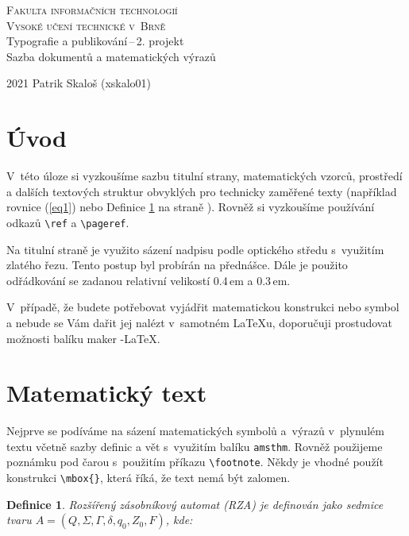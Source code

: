 \documentclass[a4paper, 11pt, twocolumn]{article}
\newtheorem{definice}{Definice}
\begin{document}
    \begin{titlepage}
        \begin{center}
            \Huge
            \textsc{Fakulta informačních technologií} \\
            \textsc{Vysoké učení technické v~Brně} \\
            \LARGE
            Typografie a publikování\,--\,2. projekt \\
            Sazba dokumentů a matematických výrazů \\
        \end{center}
        {\Large 2021\hfill
        Patrik Skaloš (xskalo01)}
    \end{titlepage}

    \section*{Úvod}
    \label{page2}
    V~této úloze si vyzkoušíme sazbu titulní strany, matematic\-kých
    vzorců, prostředí a dalších textových struktur obvyklých
    pro technicky zaměřené texty (například rovnice (\ref{eq1})
    nebo Definice \ref{def1} na straně \pageref{page2}). Rovněž si vyzkoušíme
    používání odkazů \verb|\ref| a \verb|\pageref|.

    Na titulní straně je využito sázení nadpisu podle optického středu
    s~využitím zlatého řezu. Tento postup byl probírán na přednášce. Dále je
    použito odřádkování se zadanou relativní velikostí 0.4\,em a 0.3\,em.

    V~případě, že budete potřebovat vyjádřit matematickou konstrukci nebo
    symbol a nebude se Vám dařit jej nalézt v~samotném \LaTeX{u}, doporučuji
    prostudovat možnosti balíku maker \AmS-\LaTeX.

    \section{Matematický text}
    Nejprve se podíváme na sázení matematických symbolů a~výrazů v~plynulém
    textu včetně sazby definic a vět s~využitím balíku \texttt{amsthm}. Rovněž
    použijeme poznámku pod čarou s~použitím příkazu \verb|\footnote|. Někdy je
    vhodné použít konstrukci \verb|\mbox{}|, která říká, že text nemá být zalomen.

    \begin{definice}
        \label{def1}
        \emph{Rozšířený zásobníkový automat} (RZA) je definován jako
        sedmice tvaru $A=(Q, \Sigma, \Gamma, \delta, q_0, Z_0, F)$, kde:
    \end{definice}
\end{document}
